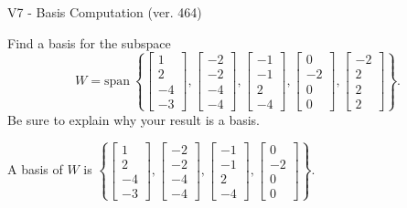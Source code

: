 \begin{exercise}
  \begin{exerciseTitle}V7 - Basis Computation (ver. 464)\end{exerciseTitle}
  \begin{exerciseStatement}
    Find a basis for the subspace 
\[W=\mathrm{span}\ \left\{\left[\begin{array}{r}
1 \\
2 \\
-4 \\
-3
\end{array}\right] , \left[\begin{array}{r}
-2 \\
-2 \\
-4 \\
-4
\end{array}\right] , \left[\begin{array}{r}
-1 \\
-1 \\
2 \\
-4
\end{array}\right] , \left[\begin{array}{r}
0 \\
-2 \\
0 \\
0
\end{array}\right] , \left[\begin{array}{r}
-2 \\
2 \\
2 \\
2
\end{array}\right]\right\}.\]
 Be sure to explain why your result is a basis.


  \end{exerciseStatement}
  \begin{exerciseAnswer}
   A basis of \(W\) is  \(\left\{\left[\begin{array}{r}
1 \\
2 \\
-4 \\
-3
\end{array}\right] , \left[\begin{array}{r}
-2 \\
-2 \\
-4 \\
-4
\end{array}\right] , \left[\begin{array}{r}
-1 \\
-1 \\
2 \\
-4
\end{array}\right] , \left[\begin{array}{r}
0 \\
-2 \\
0 \\
0
\end{array}\right]\right\}\).
  


  \end{exerciseAnswer}
\end{exercise}